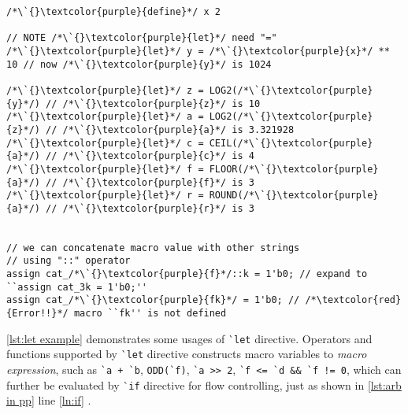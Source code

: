 \begin{lstlisting}[caption={\`{}\texttt{let} usage examples},label={lst:let example}]
/*\`{}\textcolor{purple}{define}*/ x 2

// NOTE /*\`{}\textcolor{purple}{let}*/ need "="
/*\`{}\textcolor{purple}{let}*/ y = /*\`{}\textcolor{purple}{x}*/ ** 10 // now /*\`{}\textcolor{purple}{y}*/ is 1024

/*\`{}\textcolor{purple}{let}*/ z = LOG2(/*\`{}\textcolor{purple}{y}*/) // /*\`{}\textcolor{purple}{z}*/ is 10
/*\`{}\textcolor{purple}{let}*/ a = LOG2(/*\`{}\textcolor{purple}{z}*/) // /*\`{}\textcolor{purple}{a}*/ is 3.321928
/*\`{}\textcolor{purple}{let}*/ c = CEIL(/*\`{}\textcolor{purple}{a}*/) // /*\`{}\textcolor{purple}{c}*/ is 4
/*\`{}\textcolor{purple}{let}*/ f = FLOOR(/*\`{}\textcolor{purple}{a}*/) // /*\`{}\textcolor{purple}{f}*/ is 3
/*\`{}\textcolor{purple}{let}*/ r = ROUND(/*\`{}\textcolor{purple}{a}*/) // /*\`{}\textcolor{purple}{r}*/ is 3


// we can concatenate macro value with other strings
// using "::" operator
assign cat_/*\`{}\textcolor{purple}{f}*/::k = 1'b0; // expand to ``assign cat_3k = 1'b0;''
assign cat_/*\`{}\textcolor{purple}{fk}*/ = 1'b0; // /*\textcolor{red}{Error!!}*/ macro ``fk'' is not defined 
\end{lstlisting}
\autoref{lst:let example} demonstrates some usages of \`{}\texttt{let} directive. 
Operators and functions supported by \`{}\texttt{let} directive constructs macro variables
to \emph{macro expression}, such as 
\mbox{\texttt{\`{}a + \`{}b}}, 
\mbox{\texttt{ODD(\`{}f)}}, 
\mbox{\texttt{\`{}a >> 2}}, 
\mbox{\texttt{\`{}f <= \`{}d \&\& \`{}f != 0}},
which can further be evaluated by \`{}\texttt{if} directive for flow controlling, 
just as shown in \autoref{lst:arb in pp} line \autoref{ln:if} . 
